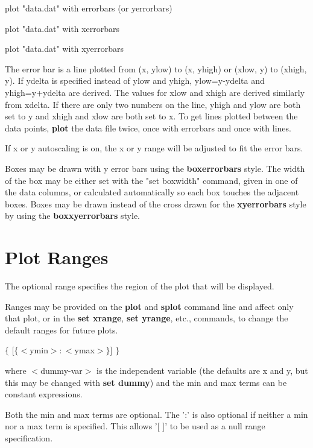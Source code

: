         plot "data.dat" with errorbars (or yerrorbars)

        plot "data.dat" with xerrorbars

        plot "data.dat" with xyerrorbars

The error bar is a line plotted from (x, ylow) to (x,
yhigh) or (xlow, y) to (xhigh, y). If ydelta is specified instead 
of ylow and yhigh, ylow=y-ydelta and yhigh=y+ydelta are derived. The
values for xlow and xhigh are derived similarly from xdelta. If there
are only two numbers on the line, yhigh and ylow are both set to
y and xhigh and xlow are both set to x. To get lines plotted between 
the data points, {\bf plot} the data file twice, once with errorbars and 
once with lines.

If x or y autoscaling is on, the x or y range will be adjusted to fit the
error bars.

Boxes may be drawn with y error bars using the {\bf boxerrorbars} style. The
width of the box may be either set with the "set boxwidth" command, given in 
one of the data columns, or calculated automatically so each box touches the 
adjacent boxes.
Boxes may be drawn instead of the cross drawn for the {\bf xyerrorbars} style 
by using the {\bf boxxyerrorbars} style. 


\section{Plot Ranges}
The optional range specifies the region of the plot that will be
displayed.

Ranges may be provided on the {\bf plot} and {\bf splot} command line and
affect only that plot, or in the {\bf set xrange}, {\bf set yrange}, etc.,
commands, to change the default ranges for future plots.

\key{[$\{<$dummy-var$> =\} \{<$xmin$> : <$xmax$>\}$]} { $\{$ [$\{<$ymin$> : <$ymax$>\}$] $\}$}

where $<$dummy-var$>$ is the independent variable (the defaults are x and
y, but this may be changed with {\bf set dummy}) and the min and max
terms can be constant expressions.

Both the min and max terms are optional. The ':' is also optional
if neither a min nor a max term is specified. This allows '[ ]' to
be used as a null range specification.

